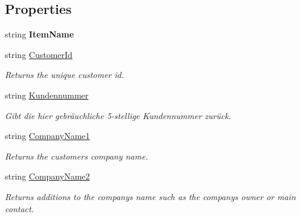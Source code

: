 \subsection*{Properties}
\begin{DoxyCompactItemize}
\item 
string {\bfseries Item\+Name}\hypertarget{class_products_1_1_model_1_1_entities_1_1_kunde_ad012e2233bcc9f8ec56ebb9038e873ee}{}\label{class_products_1_1_model_1_1_entities_1_1_kunde_ad012e2233bcc9f8ec56ebb9038e873ee}

\item 
string \hyperlink{class_products_1_1_model_1_1_entities_1_1_kunde_adca937e3f597498ed82e5820c6b3334e}{Customer\+Id}
\begin{DoxyCompactList}\small\item\em Returns the unique customer id. \end{DoxyCompactList}\item 
string \hyperlink{class_products_1_1_model_1_1_entities_1_1_kunde_a23299a9f4e46ee3f20f2806243f9a0a7}{Kundennummer}
\begin{DoxyCompactList}\small\item\em Gibt die hier gebräuchliche 5-\/stellige Kundennummer zurück. \end{DoxyCompactList}\item 
string \hyperlink{class_products_1_1_model_1_1_entities_1_1_kunde_aa3f47ecfa4306b77f41e4708050f244c}{Company\+Name1}
\begin{DoxyCompactList}\small\item\em Returns the customer\textquotesingle{}s company name. \end{DoxyCompactList}\item 
string \hyperlink{class_products_1_1_model_1_1_entities_1_1_kunde_abfef74db2b09623886e19efc336544b0}{Company\+Name2}
\begin{DoxyCompactList}\small\item\em Returns additions to the company\textquotesingle{}s name such as the company\textquotesingle{}s owner or main contact. \end{DoxyCompactList}\item 

\end{DoxyCompactItemize}
